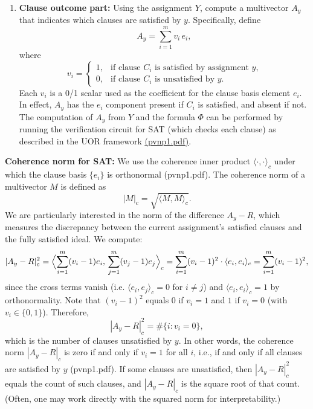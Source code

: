 \documentclass{article}
\begin{document}
\begin{itemize}
\begin{enumerate}
        \item \textbf{Clause outcome part:} Using the assignment $Y$, compute a multivector $A_y$ that indicates which clauses are satisfied by $y$. Specifically, define
        \[
        A_y = \sum_{i=1}^m v_i\, e_i,
        \]
        where 
        \[
        v_i =
        \begin{cases}
        1, & \text{if clause $C_i$ is satisfied by assignment $y$,} \\
        0, & \text{if clause $C_i$ is unsatisfied by $y$.}
        \end{cases}
        \]
        Each $v_i$ is a 0/1 scalar used as the coefficient for the clause basis element $e_i$. In effect, $A_y$ has the $e_i$ component present if $C_i$ is satisfied, and absent if not. The computation of $A_y$ from $Y$ and the formula $\Phi$ can be performed by running the verification circuit for SAT (which checks each clause) as described in the UOR framework \href{file://file-QTftUDt3ddtzkdTWkDjweC#:~:text=SAT%3A%20the%20input%20\$x\$%20describes,coherent%20UOR%20description%2C%20we%20can}{(pvnp1.pdf)}.
    \end{enumerate}
\end{itemize}

\medskip
\textbf{Coherence norm for SAT:} We use the coherence inner product $\langle \cdot,\cdot \rangle_c$ under which the clause basis $\{e_i\}$ is orthonormal (pvnp1.pdf). The coherence norm of a multivector $M$ is defined as
\[
|M|_c = \sqrt{\langle M, M \rangle_c}.
\]
We are particularly interested in the norm of the difference $A_y - R$, which measures the discrepancy between the current assignment’s satisfied clauses and the fully satisfied ideal. We compute:
\[
|A_y - R|_c^2 = \Bigl\langle \sum_{i=1}^m (v_i - 1)e_i,\, \sum_{j=1}^m (v_j - 1)e_j \Bigr\rangle_c = \sum_{i=1}^m (v_i - 1)^2 \cdot \langle e_i, e_i \rangle_c = \sum_{i=1}^m (v_i - 1)^2,
\]
since the cross terms vanish (i.e. $\langle e_i,e_j\rangle_c=0$ for $i\neq j$) and $\langle e_i,e_i\rangle_c=1$ by orthonormality. Note that $(v_i - 1)^2$ equals $0$ if $v_i=1$ and $1$ if $v_i=0$ (with $v_i\in\{0,1\}$). Therefore,
\[
|A_y - R|_c^2 = \#\{i : v_i = 0\},
\]
which is the number of clauses unsatisfied by $y$. In other words, the coherence norm $|A_y - R|_c$ is zero if and only if $v_i=1$ for all $i$, i.e., if and only if all clauses are satisfied by $y$ (pvnp1.pdf). If some clauses are unsatisfied, then $|A_y - R|_c^2$ equals the count of such clauses, and $|A_y - R|_c$ is the square root of that count. (Often, one may work directly with the squared norm for interpretability.)
\end{document}
